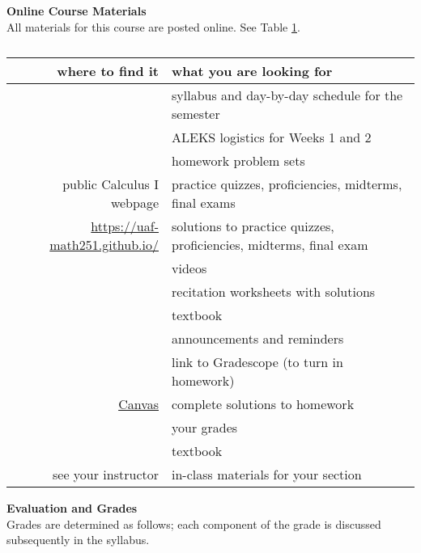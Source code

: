 \documentclass[12pt]{article}
\renewcommand{\emph}[1]{\textsf{\textbf{#1}}}
\newcommand{\localhead}[1]{\par\smallskip\textbf{#1}\nobreak\\}%
\def\heading#1{\localhead{\large\emph{#1}}}
\begin{document}
\heading{Online Course Materials}
All materials for this course are posted online. See Table \ref{wheretofind}.

\begin{table}[h]
\centering
\begin{tabular}{rl}
where to find it&what you are looking for\\
\hline \hline
&syllabus and day-by-day schedule for the semester\\
&ALEKS logistics for Weeks 1 and 2\\
&homework problem sets\\
public Calculus I webpage&practice quizzes, proficiencies, midterms, final exams\\
\href{https://uaf-math251.github.io/}{https://uaf-math251.github.io/}&solutions to practice quizzes, proficiencies, midterms, final exam\\
&videos\\
&recitation worksheets with solutions\\
&textbook\\
\hline
&announcements and reminders\\
&link to Gradescope (to turn in homework)\\
\href{https://www.uaf.edu/uaf/current/canvas.php}{Canvas}& complete solutions to homework\\
& your grades\\
&textbook\\
\hline
see your instructor&in-class materials for your section\\
\end{tabular}
\caption{}
\label{wheretofind}
\end{table}


\heading{Evaluation and Grades}
Grades are determined as follows; 
each component of the grade is discussed subsequently in
the syllabus.
 
\end{document}
